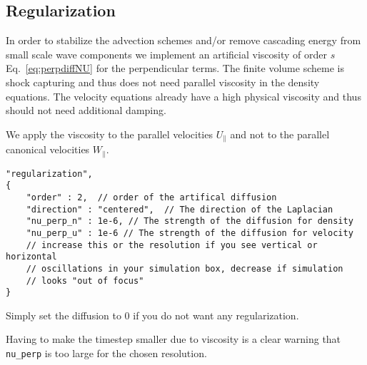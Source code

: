 \subsection{Regularization} \label{sec:regularization}
In order to stabilize the advection schemes and/or remove cascading energy
from small scale wave components
we implement an artificial viscosity of order $s$ Eq.~\eqref{eq:perpdiffNU}
for the perpendicular terms.
The finite volume scheme is shock capturing and thus does not need
parallel viscosity in the density equations.
The velocity equations already have a high physical
viscosity and thus should not need additional damping.
\begin{tcolorbox}[title=Note]
    We apply the viscosity to the parallel velocities $U_\parallel$ and
    not to the parallel canonical velocities $W_\parallel$.
\end{tcolorbox}
\begin{verbatim}
"regularization",
{
    "order" : 2,  // order of the artifical diffusion
    "direction" : "centered",  // The direction of the Laplacian
    "nu_perp_n" : 1e-6, // The strength of the diffusion for density
    "nu_perp_u" : 1e-6 // The strength of the diffusion for velocity
    // increase this or the resolution if you see vertical or horizontal
    // oscillations in your simulation box, decrease if simulation
    // looks "out of focus"
}
\end{verbatim}
Simply set the diffusion to 0 if you do not want any regularization.
\begin{tcolorbox}[title=Note]
    Having to make the timestep smaller due to viscosity
    is a clear warning that \texttt{nu_perp} is too large for the
    chosen resolution.
\end{tcolorbox}

